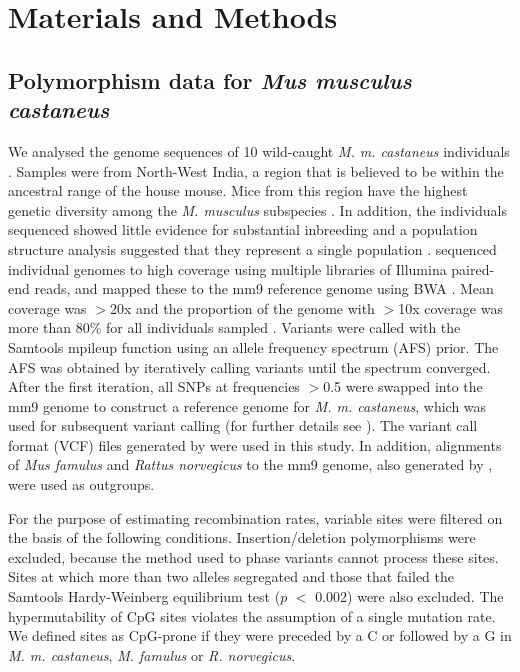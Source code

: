 \section{Materials and Methods}
 
\subsection{Polymorphism data for \textit{Mus musculus castaneus}}
 
We analysed the genome sequences of 10 wild-caught \textit{M. m. castaneus} individuals \citep{RN122}. Samples were from North-West India, a region that is believed to be within the ancestral range of the house mouse. Mice from this region have the highest genetic diversity among the \textit{M. musculus} subspecies \citep{RN233}. In addition, the individuals sequenced showed little evidence for substantial inbreeding and a population structure analysis suggested that they represent a single population \citep{RN158}. \cite{RN122} sequenced individual genomes to high coverage using multiple libraries of Illumina paired-end reads, and mapped these to the mm9 reference genome using BWA \citep{RN251}. Mean coverage was $>$20x and the proportion of the genome with $>$10x coverage was more than 80\% for all individuals sampled \citep{RN122}. Variants were called with the Samtools mpileup function \citep{RN252} using an allele frequency spectrum (AFS) prior. The AFS was obtained by iteratively calling variants until the spectrum converged. After the first iteration, all SNPs at frequencies $>$0.5 were swapped into the mm9 genome to construct a reference genome for \textit{M. m. castaneus}, which was used for subsequent variant calling (for further details see \citealt{RN122}). The variant call format (VCF) files generated by \cite{RN122} were used in this study. In addition, alignments of \textit{Mus famulus} and \textit{Rattus norvegicus} to the mm9 genome, also generated by \cite{RN122}, were used as outgroups.
 
	For the purpose of estimating recombination rates, variable sites were filtered on the basis of the following conditions. Insertion/deletion polymorphisms were excluded, because the method used to phase variants cannot process these sites. Sites at which more than two alleles segregated and those that failed the Samtools Hardy-Weinberg equilibrium test ($p$ $<$ 0.002) were also excluded. The hypermutability of CpG sites violates the assumption of a single mutation rate. We defined sites as CpG-prone if they were preceded by a C or followed by a G in \textit{M. m. castaneus}, \textit{M. famulus} or \textit{R. norvegicus}. 
 
